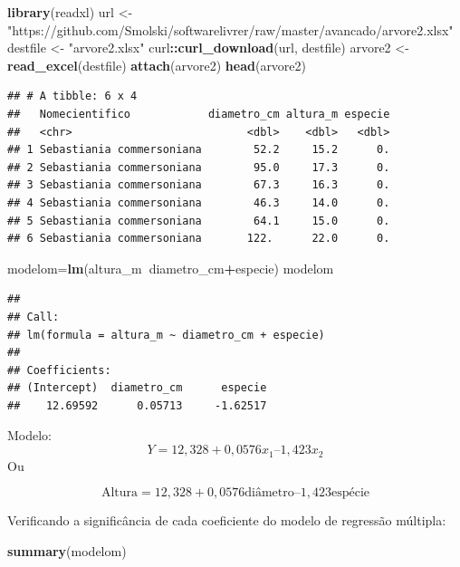 \documentclass[12pt,brazil,]{book}
\newenvironment{Shaded}{\begin{snugshade}}{\end{snugshade}}
\newcommand{\KeywordTok}[1]{\textcolor[rgb]{0.13,0.29,0.53}{\textbf{#1}}}
\newcommand{\NormalTok}[1]{#1}
\newcommand{\OperatorTok}[1]{\textcolor[rgb]{0.81,0.36,0.00}{\textbf{#1}}}
\newcommand{\StringTok}[1]{\textcolor[rgb]{0.31,0.60,0.02}{#1}}
\begin{document}
\begin{Shaded}
\begin{Highlighting}[]
\KeywordTok{library}\NormalTok{(readxl)}
\NormalTok{url <-}\StringTok{ "https://github.com/Smolski/softwarelivrer/raw/master/avancado/arvore2.xlsx"}
\NormalTok{destfile <-}\StringTok{ "arvore2.xlsx"}
\NormalTok{curl}\OperatorTok{::}\KeywordTok{curl_download}\NormalTok{(url, destfile)}
\NormalTok{arvore2 <-}\StringTok{ }\KeywordTok{read_excel}\NormalTok{(destfile)}
\KeywordTok{attach}\NormalTok{(arvore2)}
\KeywordTok{head}\NormalTok{(arvore2)}
\end{Highlighting}
\end{Shaded}

\begin{verbatim}
## # A tibble: 6 x 4
##   Nomecientifico            diametro_cm altura_m especie
##   <chr>                           <dbl>    <dbl>   <dbl>
## 1 Sebastiania commersoniana        52.2     15.2      0.
## 2 Sebastiania commersoniana        95.0     17.3      0.
## 3 Sebastiania commersoniana        67.3     16.3      0.
## 4 Sebastiania commersoniana        46.3     14.0      0.
## 5 Sebastiania commersoniana        64.1     15.0      0.
## 6 Sebastiania commersoniana       122.      22.0      0.
\end{verbatim}

\begin{Shaded}
\begin{Highlighting}[]
\NormalTok{modelom=}\KeywordTok{lm}\NormalTok{(altura_m}\OperatorTok{~}\NormalTok{diametro_cm}\OperatorTok{+}\NormalTok{especie) }
\NormalTok{modelom}
\end{Highlighting}
\end{Shaded}

\begin{verbatim}
## 
## Call:
## lm(formula = altura_m ~ diametro_cm + especie)
## 
## Coefficients:
## (Intercept)  diametro_cm      especie  
##    12.69592      0.05713     -1.62517
\end{verbatim}

Modelo: \[
Y = 12,328 + 0,0576 x_1 – 1,423 x_2
\] Ou

\[
\text{Altura} = 12,328 + 0,0576\text{diâmetro} – 1,423\text{espécie}
\]

Verificando a significância de cada coeficiente do modelo de regressão
múltipla:

\begin{Shaded}
\begin{Highlighting}[]
\KeywordTok{summary}\NormalTok{(modelom)}
\end{Highlighting}
\end{Shaded}
\end{document}
